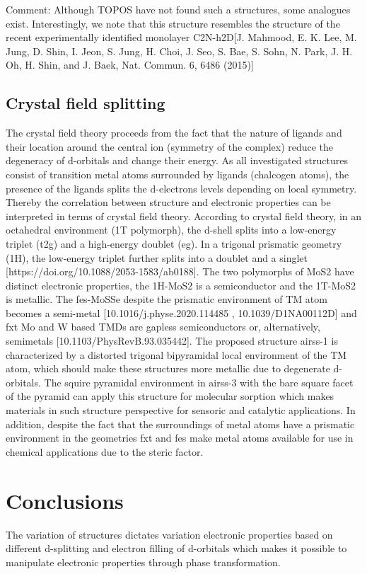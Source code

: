 \documentclass[a4paperm]{article}
\begin{document}
Comment:
Although TOPOS have not found such a structures, some analogues exist.
Interestingly, we note that this structure resembles the structure of the recent experimentally identified monolayer C2N-h2D[J. Mahmood, E. K. Lee, M. Jung, D. Shin, I. Jeon, S. Jung, H. Choi, J. Seo, S. Bae, S. Sohn, N. Park, J. H. Oh, H. Shin, and J.
Baek, Nat. Commun. 6, 6486 (2015)]





\subsection{Crystal field splitting}

The crystal field theory proceeds from the fact that the nature of ligands and their location around the central ion (symmetry of the complex) reduce the degeneracy of d-orbitals and change their energy. As all investigated structures consist of transition metal atoms surrounded by ligands (chalcogen atoms), the presence of the ligands splits the d-electrons levels depending on local symmetry. Thereby the correlation between structure and electronic properties can be interpreted in terms of crystal field theory. According to crystal field theory, in an octahedral environment (1T polymorph), the d-shell splits into a low-energy triplet (t2g) and a high-energy doublet (eg). In a trigonal prismatic geometry (1H), the low-energy triplet further splits into a doublet and a singlet [https://doi.org/10.1088/2053-1583/ab0188]. The two polymorphs of MoS2 have distinct electronic properties, the 1H-MoS2 is a semiconductor and the 1T-MoS2 is metallic. The fes-MoSSe despite the prismatic environment of TM atom becomes a semi-metal [10.1016/j.physe.2020.114485 , 10.1039/D1NA00112D] and fxt Mo and W based TMDs are gapless semiconductors or, alternatively, semimetals [10.1103/PhysRevB.93.035442]. The proposed structure airss-1 is characterized by a distorted trigonal bipyramidal local environment of the TM atom, which should make these structures more metallic due to degenerate d-orbitals. The squire pyramidal environment in airss-3 with the bare square facet of the pyramid can apply this structure for molecular sorption which makes materials in such structure perspective for sensoric and catalytic applications. In addition, despite the fact that the surroundings of metal atoms have a prismatic environment in the geometries fxt and fes make metal atoms available for use in chemical applications due to the steric factor.

\section{Conclusions}
The variation of structures dictates variation electronic properties based on different d-splitting and electron filling of d-orbitals which makes it possible to manipulate electronic properties through phase transformation.


\end{document}
